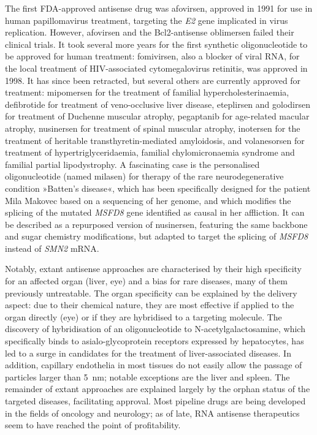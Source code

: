 The first FDA-approved antisense drug was afovirsen, approved in 1991 for use in human papillomavirus treatment, targeting the \emph{E2} gene implicated in virus replication. However, afovirsen and the Bcl2-antisense oblimersen failed their clinical trials. It took several more years for the first synthetic oligonucleotide to be approved for human treatment: fomivirsen, also a blocker of viral RNA, for the local treatment of HIV-associated cytomegalovirus retinitis, was approved in 1998.\cite{Piascik1999} It has since been retracted, but several others are currently approved for treatment: mipomersen for the treatment of familial hypercholesterinaemia, defibrotide for treatment of veno-occlusive liver disease, eteplirsen and golodirsen for treatment of Duchenne muscular atrophy, pegaptanib for age-related macular atrophy, nusinersen for treatment of spinal muscular atrophy, inotersen for the treatment of heritable transthyretin-mediated amyloidosis, and volanesorsen for treatment of hypertriglyceridaemia, familial chylomicronaemia syndrome and familial partial lipodystrophy.\cite{Sharad2019,Wang2020} A fascinating case is the personalised oligonucleotide (named milasen) for therapy of the rare neurodegenerative condition »Batten's disease«, which has been specifically designed for the patient Mila Makovec based on a sequencing of her genome, and which modifies the splicing of the mutated \emph{MSFD8} gene identified as causal in her affliction.\cite{Kim2019} It can be described as a repurposed version of nusinersen, featuring the same backbone and sugar chemistry modifications, but adapted to target the splicing of \emph{MSFD8} instead of \emph{SMN2} mRNA.

Notably, extant antisense approaches are characterised by their high specificity for an affected organ (liver, eye) and a bias for rare diseases, many of them previously untreatable. The organ specificity can be explained by the delivery aspect: due to their chemical nature, they are most effective if applied to the organ directly (eye) or if they are hybridised to a targeting molecule. The discovery of hybridisation of an oligonucleotide to N-acetylgalactosamine, which specifically binds to asialo-glycoprotein receptors expressed by hepatocytes, has led to a surge in candidates for the treatment of liver-associated diseases.\cite{Wang2020} In addition, capillary endothelia in most tissues do not easily allow the passage of particles larger than \SI{5}{\nano\metre}; notable exceptions are the liver and spleen.\cite{Gullotti2009} The remainder of extant approaches are explained largely by the orphan status of the targeted diseases, facilitating approval. Most pipeline drugs are being developed in the fields of oncology and neurology; as of late, RNA antisense therapeutics seem to have reached the point of profitability.\cite{Wang2020} 

